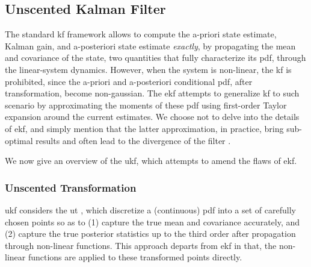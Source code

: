 \subsection{Unscented Kalman Filter}
The standard \gls{kf} framework allows to compute the a-priori state estimate, Kalman gain, and a-posteriori state estimate \textit{exactly}, by propagating the mean and covariance of the state, two quantities that fully characterize its \gls{pdf}, through the linear-system dynamics.
However, when the system is non-linear, the \gls{kf} is prohibited, since the a-priori and a-posteriori conditional \gls{pdf}, after transformation, become non-gaussian.
The \gls{ekf} \cite{ribeiro04} attempts to generalize \gls{kf} to such scenario by approximating the moments of these \gls{pdf} using first-order Taylor expansion around the current estimates.
We choose not to delve into the details of \gls{ekf}, and simply mention that the latter approximation, in practice, bring sub-optimal results and often lead to the divergence of the filter \cite{wan00}.

We now give an overview of the \gls{ukf}, which attempts to amend the flaws of \gls{ekf}.

\subsubsection{Unscented Transformation}
\gls{ukf} considers the \gls{ut} \cite{julier96}, which discretize a (continuous) \gls{pdf} into a set of carefully chosen points so as to (1) capture the true mean and covariance accurately, and (2) capture the true posterior statistics up to the third order after propagation through non-linear functions.
This approach departs from \gls{ekf} in that, the non-linear functions are applied to these transformed points directly.

